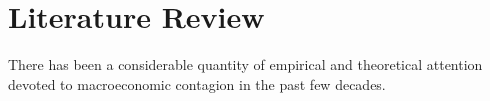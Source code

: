 \documentclass[/../base.tex]{subfiles}
\begin{document}
\section{Literature Review}

There has been a considerable quantity of empirical and theoretical attention devoted to macroeconomic contagion in the past few decades. 
\end{document}
